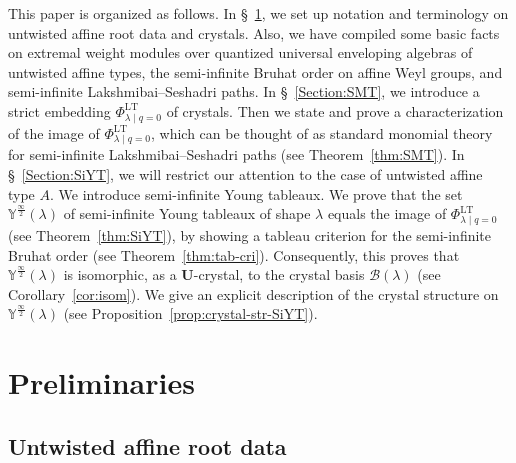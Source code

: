 \documentclass[10pt]{amsart}
\theoremstyle{definition}\newtheorem{defi}[theo]{Definition}
\theoremstyle{remark}\newtheorem{rema}[theo]{Remark}
\newcommand{\U}{\mathbf{U}}
\newcommand{\si}{\frac{\infty}{2}}
\DeclareMathOperator{\LT}{LT}
\begin{document}
This paper is organized as follows. 
In \S~\ref{Section:Weyl}, 
we set up notation and terminology on 
untwisted affine root data and crystals. 
Also, we have compiled some basic facts on 
extremal weight modules over quantized universal enveloping algebras of untwisted affine types, 
the semi-infinite Bruhat order on affine Weyl groups, 
and semi-infinite Lakshmibai--Seshadri paths. 
In \S~\ref{Section:SMT}, 
we introduce a strict embedding 
$\Phi_{\lambda \mid q=0}^{\LT }$ 
of crystals. 
Then we state and prove a characterization of the image of 
$\Phi_{\lambda \mid q=0}^{\LT }$, 
which can be thought of as standard monomial theory for 
semi-infinite Lakshmibai--Seshadri paths (see Theorem~\ref{thm:SMT}). 
In \S~\ref{Section:SiYT}, 
we will restrict our attention to the case of 
untwisted affine type $A$. 
We introduce semi-infinite Young tableaux. 
We prove that the set 
$\mathbb{Y}^{\si}(\lambda)$ 
of semi-infinite Young tableaux of shape $\lambda$ 
equals the image of 
$\Phi_{\lambda \mid q=0}^{\LT }$
(see Theorem~\ref{thm:SiYT}), 
by showing a tableau criterion for the semi-infinite Bruhat order 
(see Theorem~\ref{thm:tab-cri}). 
Consequently, this proves that 
$\mathbb{Y}^{\si}(\lambda)$ 
is isomorphic, as a $\U$-crystal, to the crystal basis 
$\mathcal{B}(\lambda)$ 
(see Corollary~\ref{cor:isom}). 
We give an explicit description of the crystal structure on 
$\mathbb{Y}^{\si}(\lambda)$ 
(see Proposition~\ref{prop:crystal-str-SiYT}). 

\section{Preliminaries} \label{Section:Weyl}

\subsection{Untwisted affine root data}
\end{document}
